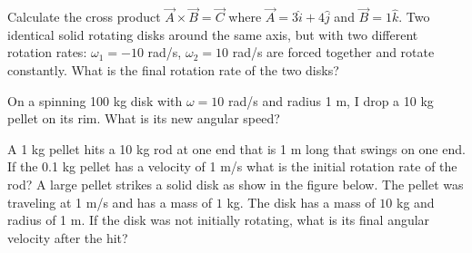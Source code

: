 \documentclass[12pt]{article}
\newcommand{\ihat}{\hat{i}}
\newcommand{\jhat}{\hat{j}}
\newcommand{\khat}{\hat{k}}
\begin{document}
\pagestyle{empty}
\noindent Calculate the cross product $\vec{A} \times \vec{B} = \vec{C}$ where $\vec{A} = 3\ihat + 4\jhat$ and $\vec{B} = 1\khat$.
\newpage
\noindent Two identical solid rotating disks around the same axis, but with two different rotation rates: $\omega_1 = -10$ rad/s, $\omega_2 = 10$ rad/s are forced together and rotate constantly.  What is the final rotation rate of the two disks? 

\newpage
\noindent On a spinning 100 kg disk with $\omega = 10$ rad/s and radius 1 m, I drop a 10 kg pellet on its rim.  What is its new angular speed?

\newpage
\noindent A 1 kg pellet hits a 10 kg rod at one end that is 1 m long that swings on one end.  If the 0.1 kg pellet has a velocity of 1 m/s what is the initial rotation rate of the rod?
\newpage
\noindent A large pellet strikes a solid disk as show in the figure below.  The pellet was traveling at 1 m/s and has a mass of $1$ kg.  The disk has a mass of $10$ kg and radius of 1 m.  If the disk was not initially rotating, what is its final angular velocity after the hit? 

\resizebox{8cm}{!}{}
\end{document}
